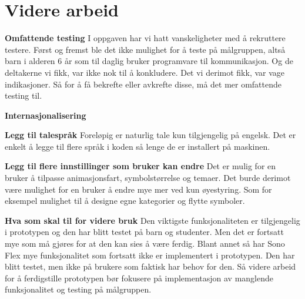 \section{Videre arbeid}

\textbf{Omfattende testing}
I oppgaven har vi hatt vanskeligheter med å rekruttere testere. Først og fremst ble det ikke mulighet for å teste på målgruppen, altså barn i alderen 6 år som til daglig bruker programvare til kommunikasjon. Og de deltakerne vi fikk, var ikke nok til å konkludere. Det vi derimot fikk, var vage indikasjoner. Så for å få bekrefte eller avkrefte disse, må det mer omfattende testing til. 


\textbf{Internasjonalisering}

\textbf{Legg til talespråk}
Foreløpig er naturlig tale kun tilgjengelig på engelsk. Det er enkelt å legge til flere språk i koden så lenge de er installert på maskinen. 

\textbf{Legg til flere innstillinger som  bruker kan endre}
Det er mulig for en bruker å tilpasse animasjonsfart, symbolstørrelse og temaer. Det burde derimot være mulighet for en bruker å endre mye mer ved kun øyestyring. Som for eksempel mulighet til å designe egne kategorier og flytte symboler. 

\textbf{Hva som skal til for videre bruk} 
Den viktigste funksjonaliteten er tilgjengelig i prototypen og den har blitt testet på barn og studenter. Men det er fortsatt mye som må gjøres for at den kan sies å være ferdig. Blant annet så har Sono Flex mye funksjonalitet som fortsatt ikke er implementert i prototypen. Den har blitt testet, men ikke på brukere som faktisk har behov for den. Så videre arbeid for å ferdigstille prototypen bør fokusere på implementasjon av manglende funksjonalitet og testing på målgruppen.

